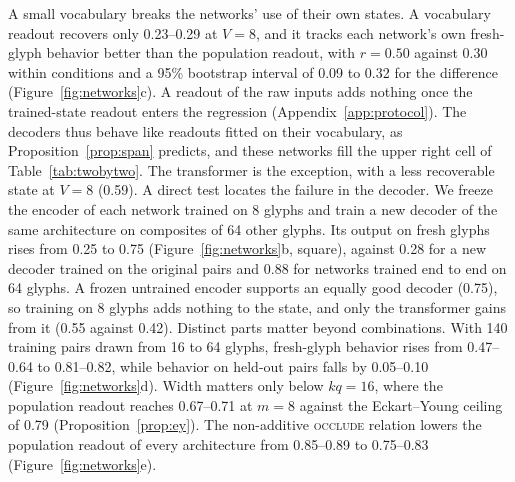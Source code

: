 \documentclass[10pt]{article}
\theoremstyle{plain}
\theoremstyle{remark}
\begin{document}
A small vocabulary breaks the networks' use of their own states. A vocabulary readout recovers only 0.23--0.29 at $V = 8$, and it tracks each network's own fresh-glyph behavior better than the population readout, with $r = 0.50$ against $0.30$ within conditions and a 95\% bootstrap interval of 0.09 to 0.32 for the difference (Figure~\ref{fig:networks}c). A readout of the raw inputs adds nothing once the trained-state readout enters the regression (Appendix~\ref{app:protocol}). The decoders thus behave like readouts fitted on their vocabulary, as Proposition~\ref{prop:span} predicts, and these networks fill the upper right cell of Table~\ref{tab:twobytwo}. The transformer is the exception, with a less recoverable state at $V = 8$ (0.59). A direct test locates the failure in the decoder. We freeze the encoder of each network trained on 8 glyphs and train a new decoder of the same architecture on composites of 64 other glyphs. Its output on fresh glyphs rises from 0.25 to 0.75 (Figure~\ref{fig:networks}b, square), against 0.28 for a new decoder trained on the original pairs and 0.88 for networks trained end to end on 64 glyphs. A frozen untrained encoder supports an equally good decoder (0.75), so training on 8 glyphs adds nothing to the state, and only the transformer gains from it (0.55 against 0.42). Distinct parts matter beyond combinations. With 140 training pairs drawn from 16 to 64 glyphs, fresh-glyph behavior rises from 0.47--0.64 to 0.81--0.82, while behavior on held-out pairs falls by 0.05--0.10 (Figure~\ref{fig:networks}d). Width matters only below $kq = 16$, where the population readout reaches 0.67--0.71 at $m = 8$ against the Eckart--Young ceiling of 0.79 (Proposition~\ref{prop:ey}). The non-additive \textsc{occlude} relation lowers the population readout of every architecture from 0.85--0.89 to 0.75--0.83 (Figure~\ref{fig:networks}e).
\end{document}
